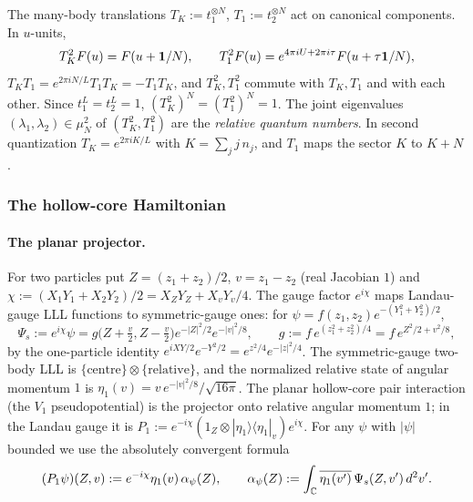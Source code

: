 The many-body translations $T_K:=t_1^{\otimes N}$, $T_1:=t_2^{\otimes N}$ act on canonical
components. In $u$-units,
\begin{equation}\label{kz:eq:TK-T1}
T_K^2F(u)=F(u+\mathbf{1}/N),\qquad T_1^2F(u)=e^{4\pi iU+2\pi i\tau}F(u+\tau\mathbf{1}/N),
\end{equation}
$T_KT_1=e^{2\pi iN/L}T_1T_K=-T_1T_K$, and $T_K^2,T_1^2$ commute with $T_K,T_1$ and with each other.
Since $t_1^L=t_2^L=1$, $(T_K^2)^N=(T_1^2)^N=1$. The joint eigenvalues $(\lambda_1,\lambda_2)\in\mu_N^2$
of $(T_K^2,T_1^2)$ are the \emph{relative quantum numbers}. In second quantization
$T_K=e^{2\pi iK/L}$ with $K=\sum_jj\,n_j$, and $T_1$ maps the sector $K$ to $K+N$.

\subsubsection{The hollow-core Hamiltonian}\label{kz:sec:ham}

\paragraph{The planar projector.} For two particles put $Z=(z_1+z_2)/2$, $v=z_1-z_2$ (real Jacobian
$1$) and $\chi:=(X_1Y_1+X_2Y_2)/2=X_ZY_Z+X_vY_v/4$. The gauge factor $e^{i\chi}$ maps Landau-gauge
LLL functions to symmetric-gauge ones: for $\psi=f(z_1,z_2)e^{-(Y_1^2+Y_2^2)/2}$,
\begin{equation}\label{kz:eq:gauge}
\Psi_s:=e^{i\chi}\psi=g\big(Z+\tfrac v2,Z-\tfrac v2\big)e^{-|Z|^2/2}e^{-|v|^2/8},\qquad
g:=f\,e^{(z_1^2+z_2^2)/4}=f\,e^{Z^2/2+v^2/8},
\end{equation}
by the one-particle identity $e^{iXY/2}e^{-Y^2/2}=e^{z^2/4}e^{-|z|^2/4}$. The symmetric-gauge
two-body LLL is $\{\text{centre}\}\otimes\{\text{relative}\}$, and the normalized relative state
of angular momentum $1$ is $\eta_1(v)=v\,e^{-|v|^2/8}/\sqrt{16\pi}$. The planar hollow-core pair
interaction (the $V_1$ pseudopotential) is the projector onto relative angular momentum $1$; in the
Landau gauge it is $P_1:=e^{-i\chi}(1_Z\otimes|\eta_1\rangle\langle\eta_1|_v)e^{i\chi}$. For any $\psi$
with $|\psi|$ bounded we use the absolutely convergent formula
\begin{equation}\label{kz:eq:P1}
(P_1\psi)(Z,v):=e^{-i\chi}\eta_1(v)\,\alpha_\psi(Z),\qquad
\alpha_\psi(Z):=\int_{\mathbb{C}}\overline{\eta_1(v')}\,\Psi_s(Z,v')\,d^2v' .
\end{equation}


